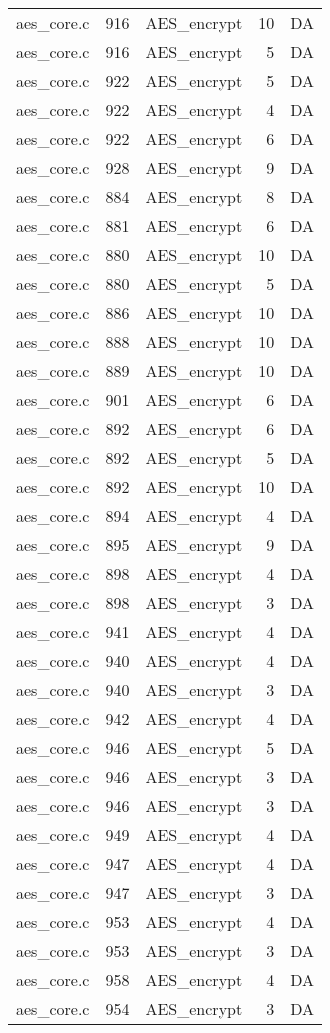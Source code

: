 \begin{table}[h]
{\begin{tabular}{clrrr}
aes\_core.c&916&AES\_encrypt&10&DA\\
aes\_core.c&916&AES\_encrypt&5 &DA\\
aes\_core.c&922&AES\_encrypt&5 &DA\\
aes\_core.c&922&AES\_encrypt&4 &DA\\
aes\_core.c&922&AES\_encrypt&6 &DA\\
aes\_core.c&928&AES\_encrypt&9 &DA\\
aes\_core.c&884&AES\_encrypt&8 &DA\\
aes\_core.c&881&AES\_encrypt&6 &DA\\
aes\_core.c&880&AES\_encrypt&10&DA\\
aes\_core.c&880&AES\_encrypt&5 &DA\\
aes\_core.c&886&AES\_encrypt&10&DA\\
aes\_core.c&888&AES\_encrypt&10&DA\\
aes\_core.c&889&AES\_encrypt&10&DA\\
aes\_core.c&901&AES\_encrypt&6 &DA\\
aes\_core.c&892&AES\_encrypt&6 &DA\\
aes\_core.c&892&AES\_encrypt&5 &DA\\
aes\_core.c&892&AES\_encrypt&10&DA\\
aes\_core.c&894&AES\_encrypt&4 &DA\\
aes\_core.c&895&AES\_encrypt&9 &DA\\
aes\_core.c&898&AES\_encrypt&4 &DA\\
aes\_core.c&898&AES\_encrypt&3 &DA\\
aes\_core.c&941&AES\_encrypt&4 &DA\\
aes\_core.c&940&AES\_encrypt&4 &DA\\
aes\_core.c&940&AES\_encrypt&3 &DA\\
aes\_core.c&942&AES\_encrypt&4 &DA\\
aes\_core.c&946&AES\_encrypt&5 &DA\\
aes\_core.c&946&AES\_encrypt&3 &DA\\
aes\_core.c&946&AES\_encrypt&3 &DA\\
aes\_core.c&949&AES\_encrypt&4 &DA\\
aes\_core.c&947&AES\_encrypt&4 &DA\\
aes\_core.c&947&AES\_encrypt&3 &DA\\
aes\_core.c&953&AES\_encrypt&4 &DA\\
aes\_core.c&953&AES\_encrypt&3 &DA\\
aes\_core.c&958&AES\_encrypt&4 &DA\\
aes\_core.c&954&AES\_encrypt&3 &DA\\
\hline
\end{tabular}
}
\end{table}